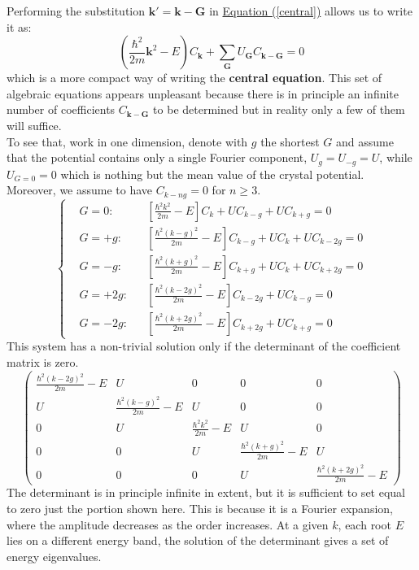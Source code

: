 \documentclass[10.75pt,a4paper,openright,bottom=2cm]{article}
\renewcommand{\Vec}[1]{\boldsymbol{#1}}
\begin{document}
\noindent Performing the substitution $\Vec{k'}=\Vec{k}-\Vec{G}$ in \hyperref[central]{Equation (\ref{central})} allows us to write it as:
\[
\left(\frac{\hbar^2}{2m}\Vec{k}^2-E\right)C_{\Vec{k}}+\sum_{\Vec{G}}U_{\Vec{G}}C_{\Vec{k}-\Vec{G}}=0
\]
which is a more compact way of writing the \textbf{central equation}. This set of algebraic equations appears unpleasant because there is in principle an infinite number of coefficients $C_{\Vec{k}-\Vec{G}}$ to be determined but in reality only a few of them will suffice.\\
To see that, work in one dimension, denote with $g$ the shortest $G$ and assume that the potential contains only a single Fourier component, $U_g=U_{-g}=U$, while $U_{G=0}=0$ which is nothing but the mean value of the crystal potential. Moreover, we assume to have $C_{k-ng}=0$ for $n\ge3$.
\[
\left\{
\begin{aligned}
&G=0: &&\left[\frac{\hbar^2k^2}{2m}-E\right]C_k+UC_{k-g}+UC_{k+g}=0\\
&G=+g: &&\left[\frac{\hbar^2(k-g)^2}{2m}-E\right]C_{k-g}+UC_k+UC_{k-2g}=0\\
&G=-g: &&\left[\frac{\hbar^2(k+g)^2}{2m}-E\right]C_{k+g}+UC_k+UC_{k+2g}=0\\
&G=+2g: &&\left[\frac{\hbar^2(k-2g)^2}{2m}-E\right]C_{k-2g}+UC_{k-g}=0\\
&G=-2g: &&\left[\frac{\hbar^2(k+2g)^2}{2m}-E\right]C_{k+2g}+UC_{k+g}=0
\end{aligned}
\right.
\]
This system has a non-trivial solution only if the determinant of the coefficient matrix is zero.
\[
\left(\begin{array}{ccccc}
    \frac{\hbar^2(k-2g)^2}{2m}-E & U & 0 & 0 & 0 \\
    U & \frac{\hbar^2(k-g)^2}{2m}-E & U & 0 & 0 \\
    0 & U & \frac{\hbar^2k^2}{2m}-E & U & 0 \\
    0 & 0 & U & \frac{\hbar^2(k+g)^2}{2m}-E & U \\
    0 & 0 & 0 & U & \frac{\hbar^2(k+2g)^2}{2m}-E
\end{array}\right)
\]
The determinant is in principle infinite in extent, but it is sufficient to set equal to zero just the portion shown here. This is because it is a Fourier expansion, where the amplitude decreases as the order increases. At a given $k$, each root $E$ lies on a different energy band, the solution of the determinant gives a set of energy eigenvalues.
\end{document}
